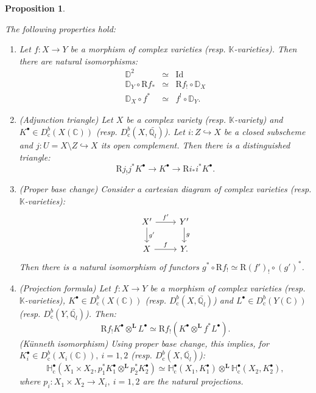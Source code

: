 \documentclass[11pt,english]{article}
\numberwithin{equation}{section}
\numberwithin{figure}{section}
\theoremstyle{definition}
\theoremstyle{plain}
\newtheorem{prop}[df]{Proposition}
\theoremstyle{remark}
\newcommand\QQ{\mathbb{Q}}
\newcommand\KK{\mathbb{K}}
\newcommand\CC{\mathbb{C}}
\begin{document}
\begin{prop} \label{Prop/FormulasD_c^b}

The following properties hold:
\begin{enumerate}
\item \cite[Prop. 3.3.7.]{Dim04}\cite[Cor. 7.5.]{KW01} Let $f:X\rightarrow Y$
be a morphism of complex varieties (resp. $\KK$-varieties). Then
there are natural isomorphisms:\[
\begin{array}{rcl}
\mathbb{D}^2 & \simeq & \mathrm{Id} \\
\mathbb{D}_Y\circ\mathrm{R}f_* & \simeq & \mathrm{R}f_!\circ\mathbb{D}_X \\
\mathbb{D}_X\circ f^* & \simeq & f^!\circ\mathbb{D}_Y.
\end{array}
\]
\item (Adjunction triangle) \cite[Prop. 5.2.2.]{Dim04}\cite[\href{https://stacks.math.columbia.edu/tag/0GKK}{Tag 0GKK}]{SP}\cite[App. A]{KW01}
Let $X$ be a complex variety (resp. $\KK$-variety) and $K^{\bullet}\in D_{\mathrm{c}}^{b}(X(\CC))$
(resp. $D_{\mathrm{c}}^{b}(X,\bar{\QQ_{l}})$). Let $i:Z\hookrightarrow X$
be a closed subscheme and $j:U=X\setminus Z\hookrightarrow X$ its
open complement. Then there is a distinguished triangle:\[
\mathrm{R}j_!j^*K^{\bullet}\rightarrow K^{\bullet}\rightarrow \mathrm{R}i_*i^*K^{\bullet}.
\]
\item (Proper base change) \cite[Thm. 2.3.26, Rmk. 2.3.27.]{Dim04}\cite[\href{https://stacks.math.columbia.edu/tag/0F7L}{Tag 0F7L}]{SP}\cite[App. A]{KW01}
Consider a cartesian diagram of complex varieties (resp. $\KK$-varieties):\[
\begin{tikzcd}[ampersand replacement=\&]
X' \ar[r,"f'"]\ar[d,"g'"] \& Y' \ar[d,"g"] \\
X \ar[r,"f"] \& Y.
\end{tikzcd}
\]Then there is a natural isomorphism of functors $g^{*}\circ\mathrm{R}f_{!}\simeq\mathrm{R}(f')_{!}\circ(g')^{*}$.
\item (Projection formula) \cite[Thm. 2.3.29.]{Dim04}\cite[\href{https://stacks.math.columbia.edu/tag/0GL5}{Tag 0GL5}]{SP}\cite[App. A]{KW01}
Let $f:X\rightarrow Y$ be a morphism of complex varieties (resp.
$\KK$-varieties), $K^{\bullet}\in D_{\mathrm{c}}^{b}(X(\CC))$ (resp.
$D_{\mathrm{c}}^{b}(X,\bar{\QQ_{l}})$) and $L^{\bullet}\in D_{\mathrm{c}}^{b}(Y(\CC))$
(resp. $D_{\mathrm{c}}^{b}(Y,\bar{\QQ_{l}})$). Then:\[
\mathrm{R}f_!K^{\bullet}\otimes^{\mathbf{L}}L^{\bullet}\simeq\mathrm{R}f_!(K^{\bullet}\otimes^{\mathbf{L}}f^*L^{\bullet}).
\] (Künneth isomorphism) Using proper base change, this implies, for
$K_{i}^{\bullet}\in D_{\mathrm{c}}^{b}(X_{i}(\CC)),\ i=1,2$ (resp.
$D_{\mathrm{c}}^{b}(X,\bar{\QQ_{l}})$):\[
\mathbb{H}_{\mathrm{c}}^{\bullet}(X_1\times X_2,p_1^*K_1^{\bullet}\otimes^{\mathbf{L}}p_2^*K_2^{\bullet})\simeq\mathbb{H}_{\mathrm{c}}^{\bullet}(X_1,K_1^{\bullet})\otimes^{\mathbf{L}}\mathbb{H}_{\mathrm{c}}^{\bullet}(X_2,K_2^{\bullet}),
\]where $p_{i}:X_{1}\times X_{2}\rightarrow X_{i},\ i=1,2$ are the
natural projections.
\end{enumerate}
\end{prop}
\end{document}
